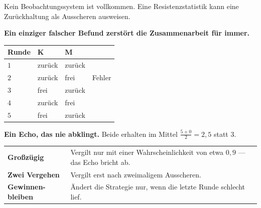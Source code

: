 \begin{warnung}
Kein Beobachtungssystem ist vollkommen. Eine Resistenzstatistik kann eine Zurückhaltung als Ausscheren ausweisen.

\begin{center}
\begin{minipage}{0.9\textwidth}
\textbf{Ein einziger falscher Befund zerstört die Zusammenarbeit für immer.}
\end{minipage}
\end{center}

\begin{center}
{\small
\renewcommand{\arraystretch}{1.44}
\begin{tabular}{@{}P{1.4cm}P{1.8cm}P{1.8cm}P{2.4cm}@{}}
\toprule
\textbf{Runde} & \textbf{K} & \textbf{M} & \\
\midrule
$1$ & zurück & zurück & \\
$2$ & zurück & \textcolor{akzent}{frei} & Fehler\\
$3$ & \textcolor{akzent}{frei} & zurück & \\
$4$ & zurück & \textcolor{akzent}{frei} & \\
$5$ & \textcolor{akzent}{frei} & zurück & \\
\bottomrule
\end{tabular}}
\end{center}

\begin{center}
\begin{minipage}{0.9\textwidth}
\textbf{Ein Echo, das nie abklingt.} Beide erhalten im Mittel $\tfrac{5+0}{2} = 2{,}5$ statt $3$.
\end{minipage}
\end{center}

\begin{center}
\begin{minipage}{0.88\textwidth}
\end{minipage}
\end{center}

\begin{center}
{\small
\renewcommand{\arraystretch}{1.5}
\begin{tabular}{@{}P{2.6cm}P{6.0cm}@{}}
\toprule
\textbf{Großzügig} & Vergilt nur mit einer Wahrscheinlichkeit von etwa $0{,}9$ --- das Echo bricht ab.\\
\textbf{Zwei Vergehen} & Vergilt erst nach zweimaligem Ausscheren.\\
\textbf{Gewinnen-bleiben} & Ändert die Strategie nur, wenn die letzte Runde schlecht lief.\\
\bottomrule
\end{tabular}}
\end{center}


\end{warnung}
